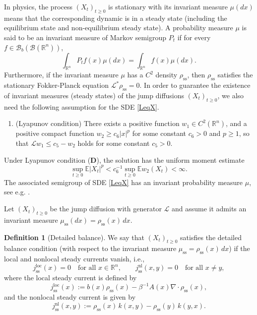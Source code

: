 \documentclass[10pt]{article}
\theoremstyle{definition}
\newtheorem{defn}{Definition}[section]
\numberwithin{equation}{section}
\begin{document}
In physics, the process $(X_t)_{t\geq 0}$ is stationary with its invariant measure $\mu(dx)$ means that the corresponding dynamic is in a steady state (including the equilibrium state and non-equilibrium steady state).
A probability measure $\mu$ is said to be an invariant measure of Markov semigroup $P_t$ if for every $f \in \mathcal{B}_b(\mathscr{B}(\mathbb{R}^n))$,
\begin{equation*}
    \int_{\mathbb{R}^n} P_t f(x) \mu(dx) = \int_{\mathbb{R}^n} f(x) \mu(dx).
\end{equation*}
Furthermore, if the invariant measure $\mu$ has a $C^2$ density $\rho_\mathrm{ss}$, then $\rho_\mathrm{ss}$ satisfies the stationary Fokker-Planck equation $\mathcal{L}^{\ast}\rho_\mathrm{ss} = 0$. 
In order to guarantee the existence of invariant measures (steady states) of the jump diffusions $(X_t)_{t\geq 0}$, we also need the following assumption for the SDE \eqref{LeqX}.
\begin{enumerate}
    \item[({\bf D})] (Lyapunov condition) There exists a positive function $w_1 \in C^2(\mathbb{R}^n)$, and a positive compact function $w_2 \geq c_6|x|^p$ for some constant $c_6>0$ and $p \geq 1$, so that $\mathcal{L}w_1 \leq c_5 - w_2$ holds for some constant $c_5>0$.
\end{enumerate}
Under Lyapunov condition ({\bf D}), the solution has the uniform moment estimate $$\sup_{t\geq0}\mathbb{E}|X_t|^p < c^{-1}_{6} \sup_{t\geq0}\mathbb{E}w_2(X_t) < \infty.$$ 
The associated semigroup of SDE \eqref{LeqX} has an invariant probability measure $\mu$, see e.g. \cite{H80}. 


Let $(X_t)_{t\ge 0}$ be the jump diffusion with generator $\mathcal L$ and assume it admits an invariant measure $\mu_{\mathrm{ss}}(dx)=\rho_{\mathrm{ss}}(x)\,dx.$

\begin{defn}[Detailed balance]
We say that $(X_t)_{t\ge0}$ satisfies the detailed balance condition (with respect to the invariant measure $\mu_{\mathrm{ss}}=\rho_{\mathrm{ss}}(x)\,dx$) if the local and nonlocal steady currents vanish, i.e.,
\[
j^{\mathrm{loc}}_{\mathrm{ss}}(x)=0 \quad \text{for all }x\in\mathbb R^n,
\qquad 
j^{\mathrm{nl}}_{\mathrm{ss}}(x,y)=0 \quad \text{for all }x\neq y,
\]
where the local steady current is defined by
\[
j^{\mathrm{loc}}_{\mathrm{ss}}(x)
:= b(x)\rho_{\mathrm{ss}}(x)-\beta^{-1} A(x)\nabla\cdot\rho_{\mathrm{ss}}(x),
\]
and the nonlocal steady current is given by
\[
j^{\mathrm{nl}}_{\mathrm{ss}}(x,y)
:= \rho_{\mathrm{ss}}(x)\,k(x,y)-\rho_{\mathrm{ss}}(y)\,k(y,x).
\]
\end{defn}
\end{document}
